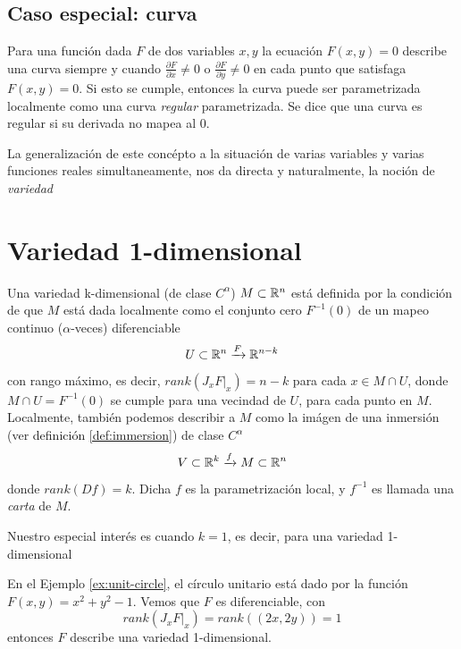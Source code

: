 \subsection{Caso especial: curva}

Para una funci\'on dada $F$ de dos variables $x,y$ la ecuaci\'on $F(x,y) = 0$ describe
una curva siempre y cuando $\frac{\partial F}{\partial x} \ne 0$ o $\frac{\partial F}{\partial y} \ne 0$
en cada punto que satisfaga $F(x,y) = 0$. Si esto se cumple, entonces la curva puede ser
parametrizada localmente como una curva \emph{regular} parametrizada. Se dice que una curva 
es regular si su derivada no mapea al $0$.

La generalizaci\'on de este conc\'epto a la situaci\'on de varias variables y varias funciones
reales simultaneamente, nos da directa y naturalmente, la noci\'on de \emph{variedad}

\section{Variedad 1-dimensional}

\begin{definition}[Variedad]
    Una variedad k-dimensional (de clase $C^{\alpha}$) $M \subset \mathbb{R}^{n}$ está definida por
    la condici\'on  de que $M$ est\'a dada localmente como el conjunto cero $F^{-1}(0)$ de un
    mapeo continuo ($\alpha$-veces) diferenciable
    $$ U \subset \mathbb{R}^{n}  \xrightarrow{F} \mathbb{R}^{n-k}$$
    con rango m\'aximo, es decir, $rank(J_{x}F|_{x})= n - k$ para cada $x \in M \cap U$, donde
    $M \cap U = F^{-1}(0)$ se cumple para una vecindad de $U$, para cada punto en $M$. \\
    Localmente, tambi\'en podemos describir a $M$ como la im\'agen de una inmersi\'on (ver
    definici\'on \ref{def:immersion}) de clase $C^{\alpha}$
    $$ V \subset \mathbb{R}^{k} \xrightarrow{f} M \subset \mathbb{R}^{n} $$
    donde $rank(Df)=k$. Dicha $f$ es la parametrizaci\'on local, y $f^{-1}$ es llamada una \emph{carta}
    de $M$.
\end{definition}

Nuestro especial inter\'es es cuando $k=1$, es decir, para una variedad 1-dimensional

\begin{example}
    En el Ejemplo \ref{ex:unit-circle}, el c\'irculo unitario est\'a dado por la funci\'on
    $F(x,y)=x^{2}+y^{2}-1$. Vemos que $F$ es diferenciable,
    con
    $$ rank(J_{x}F|_{x})=rank((2x,2y))=1 $$
    entonces $F$ describe una variedad 1-dimensional.
\end{example}

